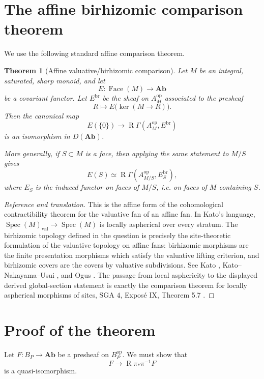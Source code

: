 \documentclass[11pt]{article}
\newtheorem{theorem}{Theorem}
\DeclareMathOperator{\Face}{Face}
\DeclareMathOperator{\Spec}{Spec}
\DeclareMathOperator{\R}{R}
\begin{document}
\section{The affine birhizomic comparison theorem}

We use the following standard affine comparison theorem.

\begin{theorem}[Affine valuative/birhizomic comparison]\label{thm:affine-comparison}
Let \(M\) be an integral, saturated, sharp monoid, and let
\[
E:\Face(M)\longrightarrow \mathbf{Ab}
\]
be a covariant functor.  Let \(E^{\mathrm{br}}\) be the sheaf on \(A_M^{\mathrm{op}}\) associated to the presheaf
\[
R\longmapsto E\bigl(\ker(M\to R)\bigr).
\]
Then the canonical map
\[
E(\{0\}) \longrightarrow \R\Gamma(A_M^{\mathrm{op}},E^{\mathrm{br}})
\]
is an isomorphism in \(D(\mathbf{Ab})\).

More generally, if \(S\subset M\) is a face, then applying the same statement to \(M/S\) gives
\[
E(S) \simeq \R\Gamma(A_{M/S}^{\mathrm{op}},E_S^{\mathrm{br}}),
\]
where \(E_S\) is the induced functor on faces of \(M/S\), i.e. on faces of \(M\) containing \(S\).
\end{theorem}

\begin{proof}[Reference and translation]
This is the affine form of the cohomological contractibility theorem for the valuative fan of an affine fan.  In Kato's language, \(\Spec(M)_{\mathrm{val}}\to \Spec(M)\) is locally aspherical over every stratum.  The birhizomic topology defined in the question is precisely the site-theoretic formulation of the valuative topology on affine fans: birhizomic morphisms are the finite presentation morphisms which satisfy the valuative lifting criterion, and birhizomic covers are the covers by valuative subdivisions.  See Kato \cite[Sections 1--3]{Kato}, Kato--Nakayama--Usui \cite[Section 3]{KNU}, and Ogus \cite[Chapter V, Sections 1--2]{Ogus}.  The passage from local asphericity to the displayed derived global-section statement is exactly the comparison theorem for locally aspherical morphisms of sites, SGA \(4\), Exposé IX, Theorem 5.7 \cite{SGA4}.
\end{proof}

\section{Proof of the theorem}

Let \(F:B_P\to \mathbf{Ab}\) be a presheaf on \(B_P^{\mathrm{op}}\).  We must show that
\[
F \longrightarrow \R\pi_*\pi^{-1}F
\]
is a quasi-isomorphism.
\end{document}
